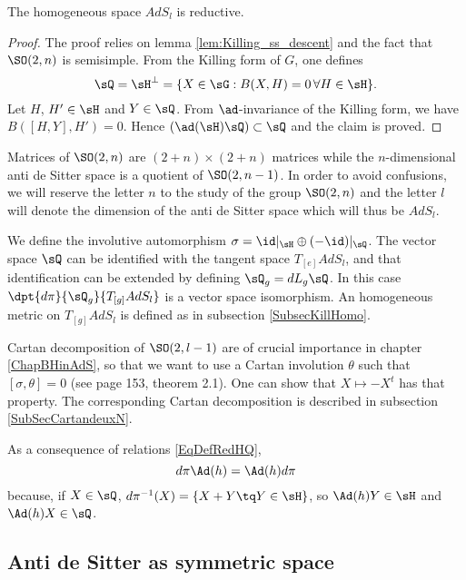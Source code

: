 \begin{proposition}
The homogeneous space $AdS_l$ is reductive.
\label{PropAdSreduct}
\end{proposition}

\begin{proof}
The proof relies on lemma \ref{lem:Killing_ss_descent} and the fact that $\SO(2,n)$ is semisimple. From the Killing form of $G$, one defines
\[
   \sQ=\sH^{\perp}=\{X\in\sG:B(X,H)=0\,\forall H\in\sH\}.
\]
Let $H$, $H'\in\sH$ and $Y\in\sQ$. From $\ad$-invariance of the Killing form, we have $B([H,Y],H')=0$. Hence $(\ad(\sH)\sQ)\subset \sQ$ and the claim is proved.

\end{proof}

Matrices of $\SO(2,n)$ are $(2+n)\times(2+n)$ matrices while the $n$-dimensional anti de Sitter space is a quotient of $\SO(2,n-1)$. In order to avoid confusions, we will reserve the letter $n$ to the study of the group $\SO(2,n)$ and the letter $l$ will denote the dimension of the anti de Sitter space which will thus be $AdS_l$.

We define the involutive automorphism $\sigma=\id|_{\sH}\oplus(-\id)|_{\sQ}$.  The vector space $\sQ$ can be identified with the tangent space $T_{[e]}AdS_l$, and that identification can be extended by defining $\sQ_g=dL_g\sQ$. In this case $\dpt{d\pi}{\sQ_g}{T_{[g]}AdS_l}$ is a vector space isomorphism.\label{PgdpibaseQTgM} An homogeneous metric on $T_{[g]}AdS_l$ is defined as in subsection \ref{SubsecKillHomo}.

Cartan decomposition of $\SO(2,l-1)$ are of crucial importance in chapter \ref{ChapBHinAdS}, so that we want to use a Cartan involution $\theta$ such that $[\sigma,\theta]=0$ (see \cite{Loos} page 153, theorem 2.1). One can show that $X\mapsto -X^t$ has that property. The corresponding Cartan decomposition is described in subsection \ref{SubSecCartandeuxN}.

As a consequence of relations \eqref{EqDefRedHQ}, 
\begin{equation}  \label{EqdpiAdpi}
d\pi\Ad(h)=\Ad(h) d\pi
\end{equation}
because, if $X\in\sQ$, $d\pi^{-1}(X)=\{ X+Y\tq Y\in\sH \}$, so $\Ad(h)Y\in\sH$ and $\Ad(h)X\in \sQ$.

\subsection{Anti de Sitter as symmetric space}
\label{pg:AdS_n_syme}

